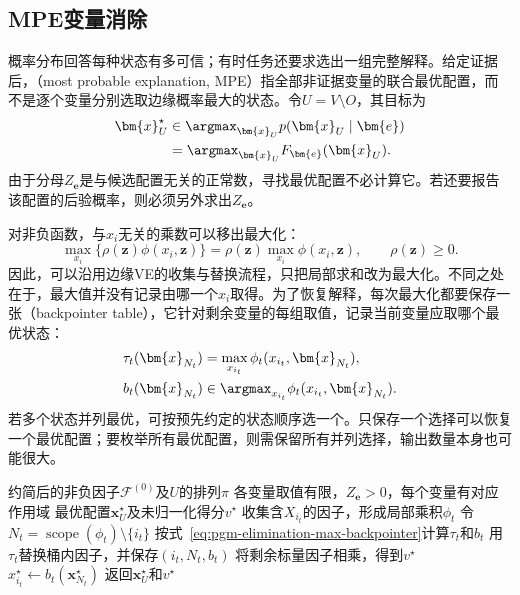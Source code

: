 \subsection{MPE变量消除}
\label{sec:pgm-elimination-mpe}

概率分布回答每种状态有多可信；有时任务还要求选出一组完整解释。给定证据后，（most probable explanation, MPE）指全部非证据变量的联合最优配置，而不是逐个变量分别选取边缘概率最大的状态。令$U=V\setminus O$，其目标为
\begin{equation}
  \begin{aligned}
    \bm{x}_U^\star
    &\in\argmax_{\bm{x}_U}p(\bm{x}_U\mid\bm{e})\\
    &=\argmax_{\bm{x}_U}F_{\bm{e}}(\bm{x}_U).
  \end{aligned}
  \label{eq:pgm-elimination-mpe-objective}
\end{equation}
由于分母$Z_{\bm{e}}$是与候选配置无关的正常数，寻找最优配置不必计算它。若还要报告该配置的后验概率，则必须另外求出$Z_{\bm{e}}$。

对非负函数，与$x_i$无关的乘数可以移出最大化：
\[
  \max_{x_i}\{\rho(\bm{z})\phi(x_i,\bm{z})\}
  =\rho(\bm{z})\max_{x_i}\phi(x_i,\bm{z}),
  \qquad \rho(\bm{z})\geq0.
\]
因此，可以沿用边缘VE的收集与替换流程，只把局部求和改为最大化。不同之处在于，最大值并没有记录由哪一个$x_i$取得。为了恢复解释，每次最大化都要保存一张（backpointer table），它针对剩余变量的每组取值，记录当前变量应取哪个最优状态：
\begin{equation}
  \begin{aligned}
    \tau_t(\bm{x}_{N_t})
      &=\max_{x_{i_t}}\phi_t(x_{i_t},\bm{x}_{N_t}),\\
    b_t(\bm{x}_{N_t})
      &\in\argmax_{x_{i_t}}\phi_t(x_{i_t},\bm{x}_{N_t}).
  \end{aligned}
  \label{eq:pgm-elimination-max-backpointer}
\end{equation}
若多个状态并列最优，可按预先约定的状态顺序选一个。只保存一个选择可以恢复一个最优配置；要枚举所有最优配置，则需保留所有并列选择，输出数量本身也可能很大。

\begin{algorithm}[MPE消元及配置回溯]
  \label{alg:pgm-elimination-mpe}
  \begin{algorithmic}[1]
    \Require 约简后的非负因子$\mathcal{F}^{(0)}$及$U$的排列$\pi$
    \Require 各变量取值有限，$Z_{\bm{e}}>0$，每个变量有对应作用域
    \Ensure 最优配置$\bm{x}_U^\star$及未归一化得分$v^\star$
      \State 收集含$X_{i_t}$的因子，形成局部乘积$\phi_t$
      \State 令$N_t=\operatorname{scope}(\phi_t)\setminus\{i_t\}$
      \State 按式~\eqref{eq:pgm-elimination-max-backpointer}计算$\tau_t$和$b_t$
      \State 用$\tau_t$替换桶内因子，并保存$(i_t,N_t,b_t)$
    \EndFor
    \State 将剩余标量因子相乘，得到$v^\star$
      \State $x_{i_t}^\star\gets b_t(\bm{x}_{N_t}^\star)$
    \EndFor
    \State 返回$\bm{x}_U^\star$和$v^\star$
  \end{algorithmic}
\end{algorithm}

